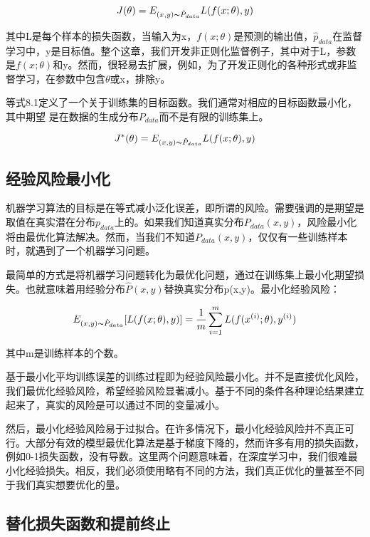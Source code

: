 \begin{equation}
J(\theta)=E_{(x,y)\thicksim\hat{P}_{data}}L(f(x;\theta),y)
\end{equation}

其中L是每个样本的损失函数，当输入为x，$f(x;\theta)$是预测的输出值，$\hat{p}_{data}$在监督学习中，y是目标值。整个这章，我们开发非正则化监督例子，其中对于L，参数是$f(x;\theta)$和y。然而，很轻易去扩展，例如，为了开发正则化的各种形式或非监督学习，在参数中包含$\theta$或x，排除y。

等式8.1定义了一个关于训练集的目标函数。我们通常对相应的目标函数最小化，其中期望 是在数据的生成分布$P_{data}$而不是有限的训练集上。

\begin{equation}
J^*(\theta)=E_{(x,y)\thicksim\hat{P}_{data}}L(f(x;\theta),y)
\end{equation}

\subsection{经验风险最小化}

机器学习算法的目标是在等式减小泛化误差，即所谓的风险。需要强调的是期望是取值在真实潜在分布$p_{data}$上的。如果我们知道真实分布$P_{data}(x,y)$，风险最小化将由最优化算法解决。然而，当我们不知道$P_{data}(x,y)$，仅仅有一些训练样本时，就遇到了一个机器学习问题。

最简单的方式是将机器学习问题转化为最优化问题，通过在训练集上最小化期望损失。也就意味着用经验分布$\hat{P}(x,y)$替换真实分布p(x,y)。最小化经验风险：

\begin{equation}
E_{(x,y)\thicksim\hat{P}_{data}}[L(f(x;\theta),y)]=\frac{1}{m}\sum_{i=1}^mL(f(x^{(i)};\theta),y^{(i)})
\end{equation}

其中m是训练样本的个数。

基于最小化平均训练误差的训练过程即为经验风险最小化。并不是直接优化风险，我们最优化经验风险，希望经验风险显著减小。基于不同的条件各种理论结果建立起来了，真实的风险是可以通过不同的变量减小。

然后，最小化经验风险易于过拟合。在许多情况下，最小化经验风险并不真正可行。大部分有效的模型最优化算法是基于梯度下降的，然而许多有用的损失函数，例如0-1损失函数，没有导数。这里两个问题意味着，在深度学习中，我们很难最小化经验损失。相反，我们必须使用略有不同的方法，我们真正优化的量甚至不同于我们真实想要优化的量。

\subsection{替化损失函数和提前终止}

